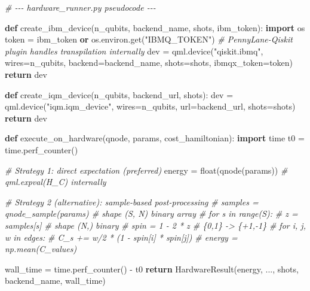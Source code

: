 \documentclass[
  11pt,
]{report}
\newenvironment{Shaded}{}{}
\newcommand{\BuiltInTok}[1]{\textcolor[rgb]{0.00,0.50,0.00}{#1}}
\newcommand{\CommentTok}[1]{\textcolor[rgb]{0.38,0.63,0.69}{\textit{#1}}}
\newcommand{\ControlFlowTok}[1]{\textcolor[rgb]{0.00,0.44,0.13}{\textbf{#1}}}
\newcommand{\ImportTok}[1]{\textcolor[rgb]{0.00,0.50,0.00}{\textbf{#1}}}
\newcommand{\KeywordTok}[1]{\textcolor[rgb]{0.00,0.44,0.13}{\textbf{#1}}}
\newcommand{\NormalTok}[1]{#1}
\newcommand{\OperatorTok}[1]{\textcolor[rgb]{0.40,0.40,0.40}{#1}}
\newcommand{\StringTok}[1]{\textcolor[rgb]{0.25,0.44,0.63}{#1}}
\begin{document}
\begin{Shaded}
\begin{Highlighting}[]
\CommentTok{\# {-}{-}{-} hardware\_runner.py pseudocode {-}{-}{-}}

\KeywordTok{def}\NormalTok{ create\_ibm\_device(n\_qubits, backend\_name, shots, ibm\_token):}
    \ImportTok{import}\NormalTok{ os}
\NormalTok{    token }\OperatorTok{=}\NormalTok{ ibm\_token }\KeywordTok{or}\NormalTok{ os.environ.get(}\StringTok{"IBMQ\_TOKEN"}\NormalTok{)}
    \CommentTok{\# PennyLane{-}Qiskit plugin handles transpilation internally}
\NormalTok{    dev }\OperatorTok{=}\NormalTok{ qml.device(}\StringTok{"qiskit.ibmq"}\NormalTok{, wires}\OperatorTok{=}\NormalTok{n\_qubits,}
\NormalTok{                      backend}\OperatorTok{=}\NormalTok{backend\_name, shots}\OperatorTok{=}\NormalTok{shots, ibmqx\_token}\OperatorTok{=}\NormalTok{token)}
    \ControlFlowTok{return}\NormalTok{ dev}


\KeywordTok{def}\NormalTok{ create\_iqm\_device(n\_qubits, backend\_url, shots):}
\NormalTok{    dev }\OperatorTok{=}\NormalTok{ qml.device(}\StringTok{"iqm.iqm\_device"}\NormalTok{, wires}\OperatorTok{=}\NormalTok{n\_qubits,}
\NormalTok{                      url}\OperatorTok{=}\NormalTok{backend\_url, shots}\OperatorTok{=}\NormalTok{shots)}
    \ControlFlowTok{return}\NormalTok{ dev}


\KeywordTok{def}\NormalTok{ execute\_on\_hardware(qnode, params, cost\_hamiltonian):}
    \ImportTok{import}\NormalTok{ time}
\NormalTok{    t0 }\OperatorTok{=}\NormalTok{ time.perf\_counter()}

    \CommentTok{\# Strategy 1: direct expectation (preferred)}
\NormalTok{    energy }\OperatorTok{=} \BuiltInTok{float}\NormalTok{(qnode(params))         }\CommentTok{\# qml.expval(H\_C) internally}

    \CommentTok{\# Strategy 2 (alternative): sample{-}based post{-}processing}
    \CommentTok{\# samples = qnode\_sample(params)      \# shape (S, N) binary array}
    \CommentTok{\# for s in range(S):}
    \CommentTok{\#     z = samples[s]                  \# shape (N,) binary}
    \CommentTok{\#     spin = 1 {-} 2 * z               \# \{0,1\} {-}\textgreater{} \{+1,{-}1\}}
    \CommentTok{\#     for i, j, w in edges:}
    \CommentTok{\#         C\_s += w/2 * (1 {-} spin[i] * spin[j])}
    \CommentTok{\# energy = np.mean(C\_values)}

\NormalTok{    wall\_time }\OperatorTok{=}\NormalTok{ time.perf\_counter() }\OperatorTok{{-}}\NormalTok{ t0}
    \ControlFlowTok{return}\NormalTok{ HardwareResult(energy, ..., shots, backend\_name, wall\_time)}



\end{Highlighting}
\end{Shaded}
\end{document}
